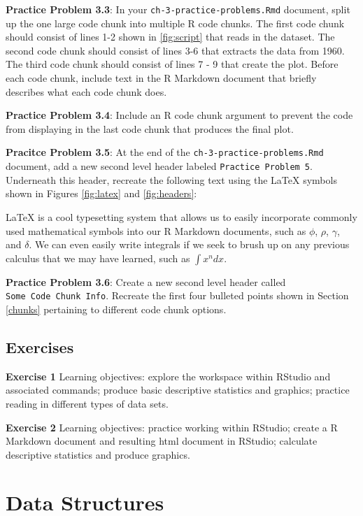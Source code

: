 \documentclass[
]{krantz}
\begin{document}
\textbf{Practice Problem 3.3}: In your \texttt{ch-3-practice-problems.Rmd} document, split up the one large code chunk into multiple R code chunks. The first code chunk should consist of lines 1-2 shown in \ref{fig:script} that reads in the dataset. The second code chunk should consist of lines 3-6 that extracts the data from 1960. The third code chunk should consist of lines 7 - 9 that create the plot. Before each code chunk, include text in the R Markdown document that briefly describes what each code chunk does.

\textbf{Practice Problem 3.4}: Include an R code chunk argument to prevent the code from displaying in the last code chunk that produces the final plot.

\textbf{Pracitce Problem 3.5}: At the end of the \texttt{ch-3-practice-problems.Rmd} document, add a new second level header labeled \texttt{Practice\ Problem\ 5}. Underneath this header, recreate the following text using the LaTeX symbols shown in Figures \ref{fig:latex} and \ref{fig:headers}:

LaTeX is a cool typesetting system that allows us to easily incorporate commonly used mathematical symbols into our R Markdown documents, such as \(\phi\), \(\rho\), \(\gamma\), and \(\delta\). We can even easily write integrals if we seek to brush up on any previous calculus that we may have learned, such as \(\int x^n dx\).

\textbf{Practice Problem 3.6}: Create a new second level header called \texttt{Some\ Code\ Chunk\ Info}. Recreate the first four bulleted points shown in Section \ref{chunks} pertaining to different code chunk options.

\hypertarget{exCh3}{%
\section{Exercises}\label{exCh3}}

\textbf{Exercise 1} Learning objectives: explore the workspace within RStudio and associated commands; produce basic descriptive statistics and graphics; practice reading in different types of data sets.

\textbf{Exercise 2} Learning objectives: practice working within RStudio; create a R Markdown document and resulting html document in RStudio; calculate descriptive statistics and produce graphics.

\hypertarget{structures}{%
\chapter{Data Structures}\label{structures}}
\end{document}
